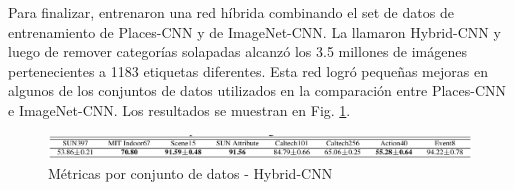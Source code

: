 Para finalizar, entrenaron una red híbrida combinando el set de datos de entrenamiento de Places-CNN y de ImageNet-CNN. La llamaron Hybrid-CNN y luego de remover categorías solapadas alcanzó los 3.5 millones de imágenes pertenecientes a 1183 etiquetas diferentes. Esta red logró pequeñas mejoras en algunos de los conjuntos de datos utilizados en la comparación entre Places-CNN e ImageNet-CNN. Los resultados se muestran en Fig. \ref{fig:placesmetricshybrid}.
\begin{figure}[h!]
	\centering
	\includegraphics[width=1\linewidth]{images/places_metrics_hybrid}
	\caption[Métricas por conjunto de datos - Hybrid-CNN]{Métricas por conjunto de datos - Hybrid-CNN}
	\label{fig:placesmetricshybrid}
\end{figure}


